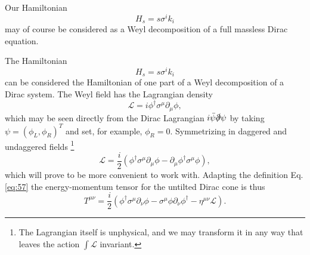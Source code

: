 Our Hamiltonian
\[
H_s = s \sigma^i k_i
\]
may of course be considered as a Weyl decomposition of a full massless Dirac equation.


The Hamiltonian
\[
H_s = s \sigma^i k_i
\]
can be considered the Hamiltonian of one part of a Weyl decomposition of a Dirac system.
The Weyl field has the Lagrangian density \cite{kachelriessQuantumFieldsHubble2018}
\begin{equation}
  \label{eq:58}
  \mathcal{L} = i \phi^{\dagger} \sigma^{\mu} \partial_{\mu} \phi,
\end{equation}
which may be seen directly from the Dirac Lagrangian \( i \bar{\psi} \slashed{\partial } \psi  \) by taking \( \psi = (\phi_L, \phi_R)^T \) and set, for example, \( \phi _R = 0 \).
Symmetrizing in daggered and undaggered fields
\footnote{The Lagrangian itself is unphysical, and we may transform it in any way that leaves the action \( \int \mathcal{L} \) invariant.}
\[
  \mathcal{L} = \frac{i}{2} \left(\phi^{\dagger} \sigma^{\mu} \partial_{\mu} \phi - \partial_{\mu} \phi^{\dagger} \sigma^{\mu} \phi \right),
\]
which will prove to be more convenient to work with.
Adapting the definition Eq. \eqref{eq:57} the energy-momentum tensor for the untilted Dirac cone is thus
\begin{equation}
  \label{eq:59}
  T^{\mu \nu} =
  \frac{i}{2} (
  \phi^{\dagger} \sigma^{\mu} \partial_{\nu} \phi
  - \sigma^{\mu} \phi \partial_{\nu} \phi^{\dagger}
  - \eta^{\mu \nu} \mathcal{L}
  ).
\end{equation}


